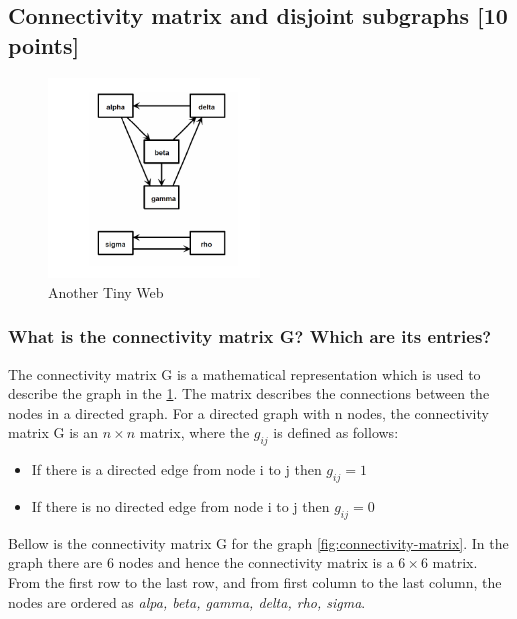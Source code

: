 \documentclass[unicode,11pt,a4paper,oneside,numbers=endperiod,openany]{scrartcl}
\begin{document}
\subsection{Connectivity matrix and disjoint subgraphs [10 points]}

\begin{figure}[H]
    \centering
    \includegraphics[width=0.5\textwidth]{images/anotherTinyWeb.png}
    \caption{Another Tiny Web}
    \label{fig:another-tiny-web}
\end{figure}

\subsubsection{What is the connectivity matrix G? Which are its entries?}

The connectivity matrix G is a mathematical representation which is used to describe the graph in the \ref{fig:another-tiny-web}. The matrix describes the connections between the nodes in a directed graph. For a directed graph with n nodes, the connectivity matrix G is an $ n \times n $ matrix, where the \(g_{ij}\) is defined as follows:

\begin{itemize}
    \item If there is a directed edge from node i to j then  $ g_{ij} = 1 $
    \item If there is no directed edge from node i to j then $ g_{ij} = 0 $
\end{itemize}

Bellow is the connectivity matrix G for the graph \ref{fig:connectivity-matrix}. In the graph there are 6 nodes and hence the connectivity matrix is a $ 6 \times 6 $ matrix. From the first row to the last row, and from first column to the last column, the nodes are ordered as \textit{alpa, beta, gamma, delta, rho, sigma}.
\end{document}
